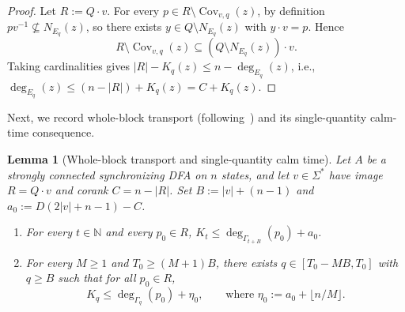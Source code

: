 \documentclass[11pt]{article}
\newtheorem{lemma}[theorem]{Lemma}
\theoremstyle{definition}
\theoremstyle{remark}
\newcommand{\Cov}{\operatorname{Cov}}
\newcommand{\N}{\mathbb{N}}
\begin{document}
\begin{proof}
Let $R := Q \cdot v$. For every $p \in R \setminus \Cov_{v, q}(z)$, by definition $p v^{-1} \not\subseteq N_{E_q}(z)$, so there exists $y \in Q \setminus N_{E_q}(z)$ with $y \cdot v = p$. Hence
\[
  R \setminus \Cov_{v, q}(z) \subseteq (Q \setminus N_{E_q}(z)) \cdot v.
\]
Taking cardinalities gives $|R| - K_q(z) \le n - \deg_{E_q}(z)$, i.e., $\deg_{E_q}(z) \le (n - |R|) + K_q(z) = C + K_q(z)$.
\end{proof}

Next, we record whole-block transport (following~\cite{Hong2026b}) and its single-quantity calm-time consequence.

\begin{lemma}[Whole-block transport and single-quantity calm time]\label{lem:whole-block-transport}
Let $A$ be a strongly connected synchronizing DFA on $n$ states, and let $v \in \Sigma^*$ have image $R = Q \cdot v$ and corank $C = n - |R|$. Set $B := |v| + (n - 1)$ and $a_0 := D(2|v| + n - 1) - C$.
\begin{enumerate}[label=(\alph*), leftmargin=2em]
  \item For every $t \in \N$ and every $p_0 \in R$, $K_t \le \deg_{\Gamma_{t + B}}(p_0) + a_0$.
  \item For every $M \ge 1$ and $T_0 \ge (M + 1) B$, there exists $q \in [T_0 - M B, T_0]$ with $q \ge B$ such that for all $p_0 \in R$,
  \[
    K_q \le \deg_{\Gamma_q}(p_0) + \eta_0, \qquad\text{where } \eta_0 := a_0 + \lfloor n / M \rfloor.
  \]
\end{enumerate}
\end{lemma}
\end{document}
